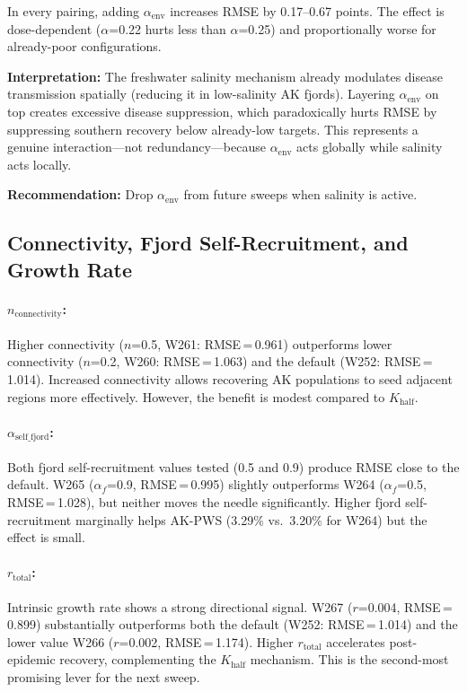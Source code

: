 \documentclass[11pt,a4paper]{article}
\begin{document}
In every pairing, adding $\alpha_{\text{env}}$ increases RMSE by 0.17--0.67 points. The effect is dose-dependent ($\alpha$=0.22 hurts less than $\alpha$=0.25) and proportionally worse for already-poor configurations.

\textbf{Interpretation:} The freshwater salinity mechanism already modulates disease transmission spatially (reducing it in low-salinity AK fjords). Layering $\alpha_{\text{env}}$ on top creates excessive disease suppression, which paradoxically hurts RMSE by suppressing southern recovery below already-low targets. This represents a genuine interaction---not redundancy---because $\alpha_{\text{env}}$ acts globally while salinity acts locally.

\textbf{Recommendation:} Drop $\alpha_{\text{env}}$ from future sweeps when salinity is active.

\subsection{Connectivity, Fjord Self-Recruitment, and Growth Rate}

\paragraph{$n_{\text{connectivity}}$:} Higher connectivity ($n$=0.5, W261: RMSE\,=\,0.961) outperforms lower connectivity ($n$=0.2, W260: RMSE\,=\,1.063) and the default (W252: RMSE\,=\,1.014). Increased connectivity allows recovering AK populations to seed adjacent regions more effectively. However, the benefit is modest compared to $K_{\text{half}}$.

\paragraph{$\alpha_{\text{self\_fjord}}$:} Both fjord self-recruitment values tested (0.5 and 0.9) produce RMSE close to the default. W265 ($\alpha_f$=0.9, RMSE\,=\,0.995) slightly outperforms W264 ($\alpha_f$=0.5, RMSE\,=\,1.028), but neither moves the needle significantly. Higher fjord self-recruitment marginally helps AK-PWS (3.29\% vs.\ 3.20\% for W264) but the effect is small.

\paragraph{$r_{\text{total}}$:} Intrinsic growth rate shows a strong directional signal. W267 ($r$=0.004, RMSE\,=\,0.899) substantially outperforms both the default (W252: RMSE\,=\,1.014) and the lower value W266 ($r$=0.002, RMSE\,=\,1.174). Higher $r_{\text{total}}$ accelerates post-epidemic recovery, complementing the $K_{\text{half}}$ mechanism. This is the second-most promising lever for the next sweep.
\end{document}
